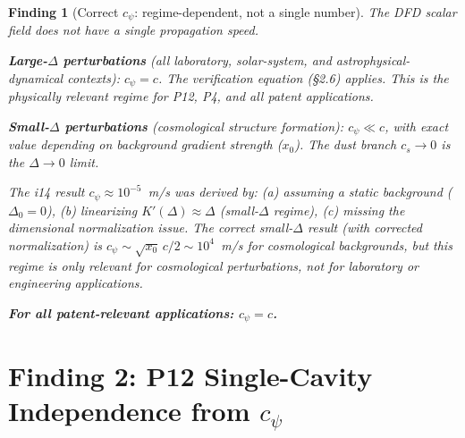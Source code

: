 \documentclass[11pt]{article}
\newtheorem{finding}{Finding}
\begin{document}
\begin{finding}[Correct $c_\psi$: regime-dependent, not a single number]
\label{find:cpsi}
The DFD scalar field does not have a single propagation speed.

\textbf{Large-$\Delta$ perturbations} (all laboratory, solar-system,
and astrophysical-dynamical contexts): $c_\psi = c$. The verification
equation (\S2.6) applies. This is the physically relevant regime for
P12, P4, and all patent applications.

\textbf{Small-$\Delta$ perturbations} (cosmological structure formation):
$c_\psi \ll c$, with exact value depending on background gradient strength
($x_0$). The dust branch $c_s \to 0$ is the $\Delta \to 0$ limit.

The i14 result $c_\psi \approx 10^{-5}$~m/s was derived by:
(a) assuming a static background ($\Delta_0 = 0$),
(b) linearizing $K'(\Delta) \approx \Delta$ (small-$\Delta$ regime),
(c) missing the dimensional normalization issue.
The correct small-$\Delta$ result (with corrected normalization) is
$c_\psi \sim \sqrt{x_0}\,c/2 \sim 10^4$~m/s for cosmological backgrounds,
but this regime is only relevant for cosmological perturbations, not for
laboratory or engineering applications.

\textbf{For all patent-relevant applications: $c_\psi = c$.}
\end{finding}


\part{Finding 2: P12 Single-Cavity Independence from $c_\psi$}
\label{part:p12}
\end{document}
